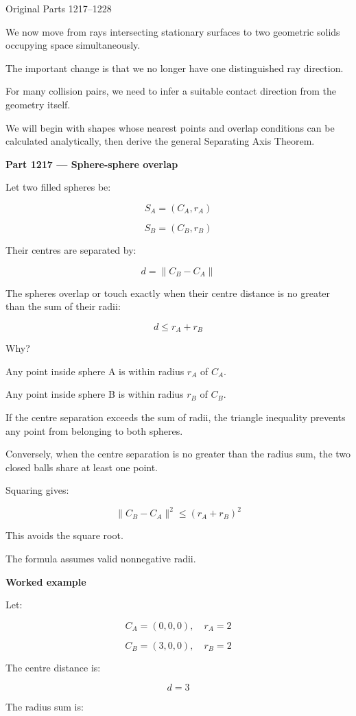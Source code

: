 Original Parts 1217--1228

We now move from rays intersecting stationary surfaces to two geometric solids occupying space simultaneously.

The important change is that we no longer have one distinguished ray direction.

For many collision pairs, we need to infer a suitable contact direction from the geometry itself.

We will begin with shapes whose nearest points and overlap conditions can be calculated analytically, then derive the general Separating Axis Theorem.

\textbf{Part 1217 --- Sphere-sphere overlap}

Let two filled spheres be:

\[
S_A=(C_A,r_A)
\]

\[
S_B=(C_B,r_B)
\]

Their centres are separated by:

\[
d=\|C_B-C_A\|
\]

The spheres overlap or touch exactly when their centre distance is no greater than the sum of their radii:

\[
\boxed{ d\le r_A+r_B }
\]

Why?

Any point inside sphere A is within radius \(r_A\) of \(C_A\).

Any point inside sphere B is within radius \(r_B\) of \(C_B\).

If the centre separation exceeds the sum of radii, the triangle inequality prevents any point from belonging to both spheres.

Conversely, when the centre separation is no greater than the radius sum, the two closed balls share at least one point.

Squaring gives:

\[
\boxed{ \|C_B-C_A\|^2\le(r_A+r_B)^2 }
\]

This avoids the square root.

The formula assumes valid nonnegative radii.

\textbf{Worked example}

Let:

\[
C_A=(0,0,0),\quad r_A=2
\]

\[
C_B=(3,0,0),\quad r_B=2
\]

The centre distance is:

\[
d=3
\]

The radius sum is:

